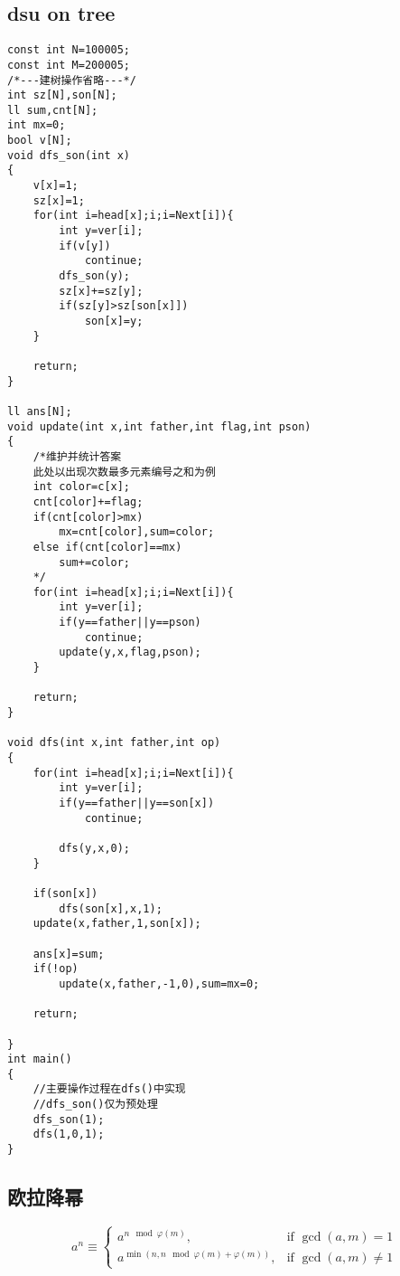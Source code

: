 \documentclass[twocolumn,a4]{article}
\begin{document}
\subsection{dsu on tree}
\begin{lstlisting}
const int N=100005;
const int M=200005;
/*---建树操作省略---*/
int sz[N],son[N];
ll sum,cnt[N];
int mx=0;
bool v[N];
void dfs_son(int x)
{
    v[x]=1;
    sz[x]=1;
    for(int i=head[x];i;i=Next[i]){
        int y=ver[i];
        if(v[y])
            continue;
        dfs_son(y);
        sz[x]+=sz[y];
        if(sz[y]>sz[son[x]])
            son[x]=y;
    }
    
    return;
}

ll ans[N];
void update(int x,int father,int flag,int pson)
{
    /*维护并统计答案
    此处以出现次数最多元素编号之和为例
    int color=c[x];
    cnt[color]+=flag;
    if(cnt[color]>mx)
        mx=cnt[color],sum=color;
    else if(cnt[color]==mx)
        sum+=color;
    */
    for(int i=head[x];i;i=Next[i]){
        int y=ver[i];
        if(y==father||y==pson)
            continue;
        update(y,x,flag,pson);
    }
    
    return;
}

void dfs(int x,int father,int op)
{
    for(int i=head[x];i;i=Next[i]){
        int y=ver[i];
        if(y==father||y==son[x])
            continue;
            
        dfs(y,x,0);
    }
    
    if(son[x])
        dfs(son[x],x,1);
    update(x,father,1,son[x]);
    
    ans[x]=sum;
    if(!op)
        update(x,father,-1,0),sum=mx=0;
        
    return;
    
}
int main()
{
    //主要操作过程在dfs()中实现
    //dfs_son()仅为预处理
    dfs_son(1);
    dfs(1,0,1);
}
\end{lstlisting}
\subsection{欧拉降幂}
\begin{large}
    $$    a^n \equiv
        \begin{cases}
            a^{n \mod \varphi(m)},                       & \text{if } \gcd(a, m) = 1    \\
            a^{\min(n, n \mod \varphi(m) + \varphi(m))}, & \text{if } \gcd(a, m) \neq 1
        \end{cases}
    $$
    \\
\end{large}
\end{document}
